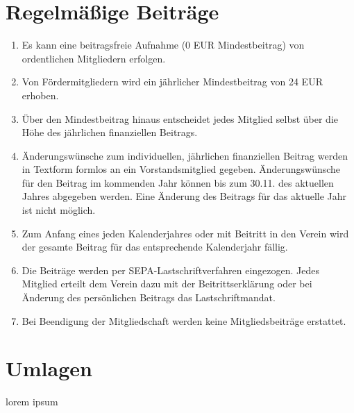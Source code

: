 \documentclass[12pt,a4paper,draft]{article}
\begin{document}
\section{Regelmäßige Beiträge}
\begin{enumerate}
\item Es kann eine beitragsfreie Aufnahme (0 EUR Mindestbeitrag) von ordentlichen Mitgliedern erfolgen.

\item Von Fördermitgliedern wird ein jährlicher Mindestbeitrag von 24 EUR erhoben.

\item Über den Mindestbeitrag hinaus entscheidet jedes Mitglied selbst über die Höhe des jährlichen
finanziellen Beitrags.

\item Änderungswünsche zum individuellen, jährlichen finanziellen Beitrag werden in Textform formlos an
ein Vorstandsmitglied gegeben. Änderungswünsche für den Beitrag im kommenden Jahr können bis zum 30.11.
des aktuellen Jahres abgegeben werden. Eine Änderung des Beitrags für das aktuelle Jahr ist nicht möglich.

\item Zum Anfang eines jeden Kalenderjahres oder mit Beitritt in den Verein wird der gesamte Beitrag für
das entsprechende Kalenderjahr fällig.

\item Die Beiträge werden per SEPA-Lastschriftverfahren eingezogen. Jedes Mitglied erteilt dem Verein
dazu mit der Beitrittserklärung oder bei Änderung des persönlichen Beitrags das Lastschriftmandat.

\item Bei Beendigung der Mitgliedschaft werden keine Mitgliedsbeiträge 
erstattet.
\end{enumerate}

\section{Umlagen}

\item lorem ipsum
\end{document}
